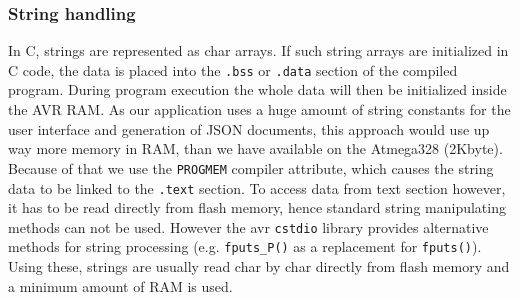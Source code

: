 \documentclass[a4paper]{scrreprt}
\begin{document}
\subsubsection{String handling}
In C, strings are represented as char arrays. If such string arrays are initialized in C code, the data is placed
into the \texttt{.bss} or \texttt{.data} section of the compiled program. During program execution the whole data
will then be initialized inside the AVR RAM. As our application uses a huge amount of string constants for the user interface and
generation of JSON documents, this approach would use up way more memory in RAM, than we have available on the Atmega328 (2Kbyte).\\
Because of that we use the \texttt{PROGMEM} compiler attribute, which causes the string data to be linked to the \texttt{.text} section.
To access data from text section however, it has to be read directly from flash memory, hence standard string manipulating methods
can not be used. However the avr \texttt{cstdio} library provides alternative methods for string processing (e.g. \texttt{fputs\_P()}
as a replacement for \texttt{fputs()}). Using these, strings are usually read char by char directly from flash memory and a minimum
amount of RAM is used.
\end{document}
